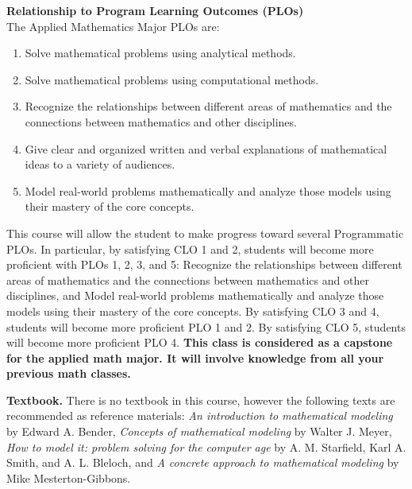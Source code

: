 \documentclass{article}
\newcommand{\secskip}{\vspace{6pt}}
\begin{document}
\secskip


\textbf{Relationship to Program Learning Outcomes (PLOs)} \\
The Applied Mathematics Major PLOs are:
\begin{enumerate}
\item Solve mathematical problems using analytical methods.
\item Solve mathematical problems using computational methods.
\item Recognize the relationships between different areas of mathematics and the connections between mathematics and other disciplines.
\item Give clear and organized written and verbal explanations of mathematical ideas to a variety of audiences.
\item Model real-world problems mathematically and analyze those models using their mastery of the core concepts.
\end{enumerate}

This course will allow the student to make progress toward several Programmatic PLOs. In particular, by satisfying CLO 1 and 2, students will become more proficient with PLOs 1, 2, 3, and 5: Recognize the relationships between different areas of mathematics and the connections between mathematics and other disciplines, and Model real-world problems mathematically and analyze those models using their mastery of the core concepts. By satisfying CLO 3 and 4, students will become more proficient PLO 1 and 2.  By satisfying CLO 5, students will become more proficient PLO 4. \textbf{This class is considered as a capstone for the applied math major. It will involve knowledge from all your previous math classes.}

\secskip

\textbf{Textbook.} There is no textbook in this course, however the following texts are recommended as reference materials: {\it An introduction to mathematical modeling} by Edward A. Bender, {\it Concepts of mathematical modeling} by Walter J. Meyer, {\it How to model it: problem solving for the computer age} by A. M. Starfield, Karl A. Smith, and A. L. Bleloch, and {\it A concrete approach to mathematical modeling} by Mike Mesterton-Gibbons. 
\end{document}
